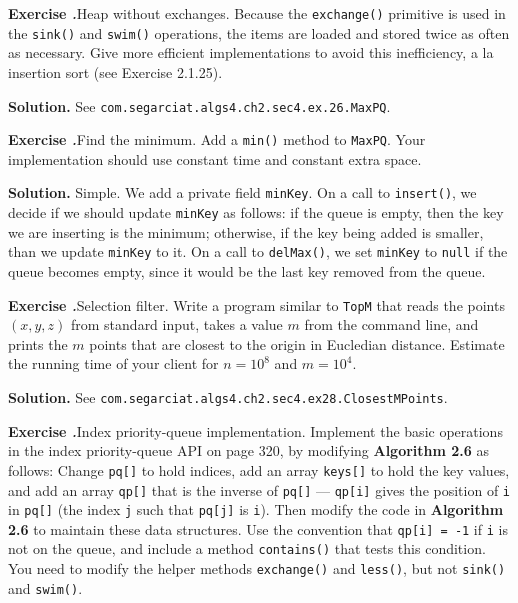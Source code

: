 \documentclass[12pt, a4paper]{article}
\newenvironment{ex}[2][Exercise]
{\par\medskip\noindent \textbf{#1 #2.}}
{\medskip}
\newenvironment{sol}[1][Solution]
{\par\medskip\noindent \textbf{#1.} }
{\medskip}
\begin{document}
	\begin{ex}{26}
		\emph{Heap without exchanges}. Because the \texttt{exchange()} primitive is used
		in the \texttt{sink()} and \texttt{swim()} operations, the items are loaded
		and stored twice as often as necessary. Give more efficient implementations
		to avoid this inefficiency, a la insertion sort (see Exercise 2.1.25).
	\end{ex}
	\begin{sol}
		See \texttt{com.segarciat.algs4.ch2.sec4.ex.26.MaxPQ}.
	\end{sol}
	\begin{ex}{27}
		\emph{Find the minimum}. Add a \texttt{min()} method to \texttt{MaxPQ}. Your
		implementation should use constant time and constant extra space.
	\end{ex}
	\begin{sol}
		Simple. We add a private field \texttt{minKey}. On a call to \texttt{insert()},
		we decide if we should update \texttt{minKey} as follows: if the queue
		is empty, then the key we are inserting is the minimum; otherwise, if
		the key being added is smaller, than we update \texttt{minKey} to it.
		On a call to \texttt{delMax()}, we set \texttt{minKey} to \texttt{null}
		if the queue becomes empty, since it would be the last key removed
		from the queue.
	\end{sol}
	\begin{ex}{28}
		\emph{Selection filter}. Write a program similar to \texttt{TopM} that
		reads the points $(x, y, z)$ from standard input, takes a value $m$ from
		the command line, and prints the $m$ points that are closest to the
		origin in Eucledian distance. Estimate the running time of your client
		for $n=10^8$ and $m=10^4$.
	\end{ex}
	\begin{sol}
		See \texttt{com.segarciat.algs4.ch2.sec4.ex28.ClosestMPoints}.
	\end{sol}
	\begin{ex}{33}
		\emph{Index priority-queue implementation}. Implement the basic operations in
		the index priority-queue API on page 320, by modifying \textbf{Algorithm 2.6}
		as follows: Change \texttt{pq[]} to hold indices, add an array \texttt{keys[]}
		to hold the key values, and add an array \texttt{qp[]} that is the inverse
		of \texttt{pq[]} --- \texttt{qp[i]} gives the position of \texttt{i} in
		\texttt{pq[]} (the index \texttt{j} such that \texttt{pq[j]} is \texttt{i}).
		Then modify the code in \textbf{Algorithm 2.6} to maintain these data structures.
		Use the convention that \texttt{qp[i] = -1} if \texttt{i} is not on the queue,
		and include a method \texttt{contains()} that tests this condition. You need
		to modify the helper methods \texttt{exchange()} and \texttt{less()}, but
		not \texttt{sink()} and \texttt{swim()}.
	\end{ex}
	\pagebreak
	\printbibliography
\end{document}
